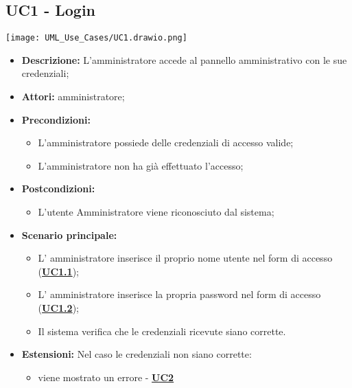 \setcounter{secnumdepth}{0}

\subsection{UC1 - Login}
\label{sec:UC1}
\texttt{[image: UML\_Use\_Cases/UC1.drawio.png]}
\begin{itemize}
	\item \textbf{Descrizione:} L’amministratore accede al pannello amministrativo con le sue credenziali;
	\item \textbf{Attori:} amministratore;
	\item \textbf{Precondizioni:} 
	\begin{itemize}
		\item L’amministratore possiede delle credenziali di accesso valide;
		\item L’amministratore non ha già effettuato l’accesso;
	\end{itemize}
	\item \textbf{Postcondizioni:} 
	\begin{itemize}
		\item L’utente Amministratore viene riconosciuto dal sistema;
	\end{itemize}
	\item \textbf{Scenario principale:} 
	\begin{itemize}
		\item L’ amministratore inserisce il proprio nome utente nel form di accesso (\hyperref[sec:UC1.1]{\textbf{UC1.1}});
		\item L’ amministratore inserisce la propria password nel form di accesso (\hyperref[sec:UC1.2]{\textbf{UC1.2}});
		\item Il sistema verifica che le credenziali ricevute siano corrette. 
	\end{itemize}
	\item \textbf{Estensioni:} Nel caso le credenziali non siano corrette:
	\begin{itemize}
		\item viene mostrato un errore - \hyperref[sec:UC2]{\textbf{UC2}}
	\end{itemize}
\end{itemize}

